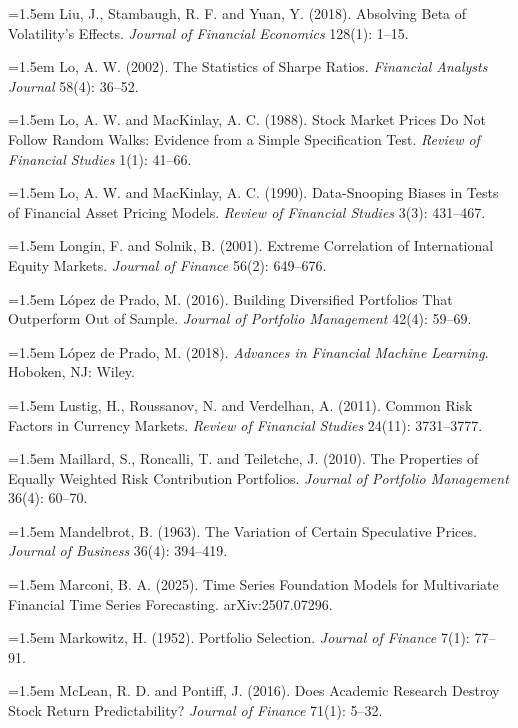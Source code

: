 \hangindent=1.5em Liu, J., Stambaugh, R. F. and Yuan, Y. (2018). Absolving Beta of Volatility's Effects. \emph{Journal of Financial Economics} 128(1): 1--15.

\hangindent=1.5em Lo, A. W. (2002). The Statistics of Sharpe Ratios. \emph{Financial Analysts Journal} 58(4): 36--52.

\hangindent=1.5em Lo, A. W. and MacKinlay, A. C. (1988). Stock Market Prices Do Not Follow Random Walks: Evidence from a Simple Specification Test. \emph{Review of Financial Studies} 1(1): 41--66.

\hangindent=1.5em Lo, A. W. and MacKinlay, A. C. (1990). Data-Snooping Biases in Tests of Financial Asset Pricing Models. \emph{Review of Financial Studies} 3(3): 431--467.

\hangindent=1.5em Longin, F. and Solnik, B. (2001). Extreme Correlation of International Equity Markets. \emph{Journal of Finance} 56(2): 649--676.

\hangindent=1.5em L\'opez de Prado, M. (2016). Building Diversified Portfolios That Outperform Out of Sample. \emph{Journal of Portfolio Management} 42(4): 59--69.

\hangindent=1.5em L\'opez de Prado, M. (2018). \emph{Advances in Financial Machine Learning}. Hoboken, NJ: Wiley.

\hangindent=1.5em Lustig, H., Roussanov, N. and Verdelhan, A. (2011). Common Risk Factors in Currency Markets. \emph{Review of Financial Studies} 24(11): 3731--3777.

\hangindent=1.5em Maillard, S., Roncalli, T. and Teiletche, J. (2010). The Properties of Equally Weighted Risk Contribution Portfolios. \emph{Journal of Portfolio Management} 36(4): 60--70.

\hangindent=1.5em Mandelbrot, B. (1963). The Variation of Certain Speculative Prices. \emph{Journal of Business} 36(4): 394--419.

\hangindent=1.5em Marconi, B. A. (2025). Time Series Foundation Models for Multivariate Financial Time Series Forecasting. arXiv:2507.07296.

\hangindent=1.5em Markowitz, H. (1952). Portfolio Selection. \emph{Journal of Finance} 7(1): 77--91.

\hangindent=1.5em McLean, R. D. and Pontiff, J. (2016). Does Academic Research Destroy Stock Return Predictability? \emph{Journal of Finance} 71(1): 5--32.

